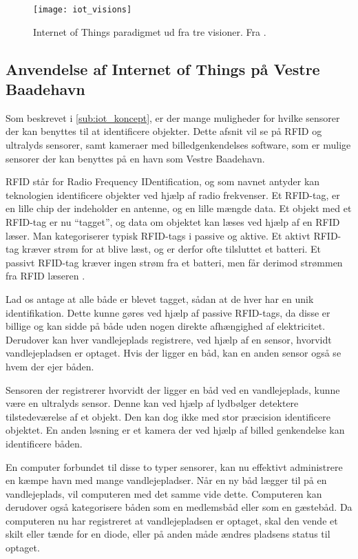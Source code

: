 \begin{figure}
  \centering
  \texttt{[image: iot\_visions]}
  \caption{Internet of Things paradigmet ud fra tre visioner. Fra \cite{iot_survey_2010}.}
  \label{fig:iot_visions}
\end{figure}

\subsection{Anvendelse af Internet of Things på Vestre Baadehavn}
\label{sub:iot_vestre_baadehavn}


Som beskrevet i \cref{sub:iot_koncept}, er der mange muligheder for hvilke sensorer der kan benyttes til at identificere objekter. Dette afsnit vil se på RFID og ultralyds sensorer, samt kameraer med billedgenkendelses software, som er mulige sensorer der kan benyttes på en havn som Vestre Baadehavn.

RFID står for Radio Frequency IDentification, og som navnet antyder kan teknologien identificere objekter ved hjælp af radio frekvenser. Et RFID-tag, er en lille chip der indeholder en antenne, og en lille mængde data. Et objekt med et RFID-tag er nu \enquote{tagget}, og data om objektet kan læses ved hjælp af en RFID læser. Man kategoriserer typisk RFID-tags i passive og aktive. Et aktivt RFID-tag kræver strøm for at blive læst, og er derfor ofte tilsluttet et batteri. Et passivt RFID-tag kræver ingen strøm fra et batteri, men får derimod strømmen fra RFID læseren \cite{want2006rfid}.

Lad os antage at alle både er blevet tagget, sådan at de hver har en unik identifikation. Dette kunne gøres ved hjælp af passive RFID-tags, da disse er billige og kan sidde på både uden nogen direkte afhængighed af elektricitet. Derudover kan hver vandlejeplads registrere, ved hjælp af en sensor, hvorvidt vandlejepladsen er optaget. Hvis der ligger en båd, kan en anden sensor også se hvem der ejer båden.

Sensoren der registrerer hvorvidt der ligger en båd ved en vandlejeplads, kunne være en ultralyds sensor. Denne kan ved hjælp af lydbølger detektere tilstedeværelse af et objekt. Den kan dog ikke med stor præcision identificere objektet. En anden løsning er et kamera der ved hjælp af billed genkendelse kan identificere båden.

En computer forbundet til disse to typer sensorer, kan nu effektivt administrere en kæmpe havn med mange vandlejepladser. Når en ny båd lægger til på en vandlejeplads, vil computeren med det samme vide dette. Computeren kan derudover også kategorisere båden som en medlemsbåd eller som en gæstebåd. Da computeren nu har registreret at vandlejepladsen er optaget, skal den vende et skilt eller tænde for en diode, eller på anden måde ændres pladsens status til optaget.


